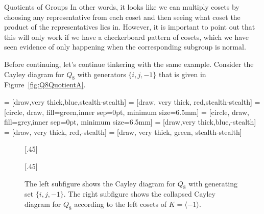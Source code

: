 \begin{section}{Quotients of Groups}
In other words, it looks like we can multiply cosets by choosing any representative from each coset and then seeing what coset the product of the representatives lies in.  However, it is important to point out that this will only work if we have a checkerboard pattern of cosets, which we have seen evidence of only happening when the corresponding subgroup is normal.

Before continuing, let's continue tinkering with the same example.  Consider the Cayley diagram for $Q_8$ with generators $\{i,j,-1\}$ that is given in Figure~\ref{fig:Q8QuotientA}.

 = [draw,very thick,blue,stealth-stealth]
 = [draw, very thick, red,stealth-stealth]
 = [circle, draw, fill=green,inner sep=0pt, minimum size=6.5mm]
 = [circle, draw, fill=grey,inner sep=0pt, minimum size=6.5mm]
 = [draw,very thick,blue,-stealth]
 = [draw, very thick, red,-stealth]
 = [draw, very thick, green, stealth-stealth]

\begin{figure}[!ht]
\centering
\subcaptionbox{\label{fig:Q8QuotientA}}[.45\textwidth]{
}
\subcaptionbox{\label{fig:Q8QuotientB}}[.45\textwidth]{
}
\caption{The left subfigure shows the Cayley diagram for $Q_8$ with generating set $\{i,j,-1\}$. The right subfigure shows the collapsed Cayley diagram for $Q_8$ according to the left cosets of $K=\langle -1\rangle$.}
\label{fig:Q8Repeat}
\end{figure}


\end{section}
